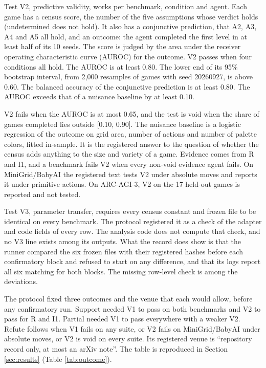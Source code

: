 \documentclass[twocolumn]{svjour3}
\begin{document}
Test V2, predictive validity, works per benchmark, condition and agent.
Each game has a census score, the number of the five assumptions whose
verdict holds (undetermined does not hold). It also has a conjunctive
prediction, that A2, A3, A4 and A5 all hold, and an outcome: the agent
completed the first level in at least half of its 10 seeds. The score is
judged by the area under the receiver operating characteristic curve
(AUROC) for the outcome. V2 passes when four conditions all hold. The
AUROC is at least 0.80. The lower end of its 95\% bootstrap interval,
from 2,000 resamples of games with seed 20260927, is above 0.60. The
balanced accuracy of the conjunctive prediction is at least 0.80. The
AUROC exceeds that of a nuisance baseline by at least 0.10.

V2 fails when the AUROC is at most 0.65, and the test is void when the
share of games completed lies outside {[}0.10, 0.90{]}. The nuisance
baseline is a logistic regression of the outcome on grid area, number of
actions and number of palette colors, fitted in-sample. It is the
registered answer to the question of whether the census adds anything to
the size and variety of a game. Evidence comes from R and I1, and a
benchmark fails V2 when every non-void evidence agent fails. On
MiniGrid/BabyAI the registered text tests V2 under absolute moves and
reports it under primitive actions. On ARC-AGI-3, V2 on the 17 held-out
games is reported and not tested.

Test V3, parameter transfer, requires every census constant and frozen
file to be identical on every benchmark. The protocol registered it as a
check of the adapter and code fields of every row. The analysis code
does not compute that check, and no V3 line exists among its outputs.
What the record does show is that the runner compared the six frozen
files with their registered hashes before each confirmatory block and
refused to start on any difference, and that its logs report all six
matching for both blocks. The missing row-level check is among the
deviations.

The protocol fixed three outcomes and the venue that each would allow,
before any confirmatory run. Support needed V1 to pass on both
benchmarks and V2 to pass for R and I1. Partial needed V1 to pass
everywhere with a weaker V2. Refute follows when V1 fails on any suite,
or V2 fails on MiniGrid/BabyAI under absolute moves, or V2 is void on
every suite. Its registered venue is ``repository record only, at most
an arXiv note''. The table is reproduced in Section \ref{sec:results}
(Table \ref{tab:outcome}).
\end{document}
